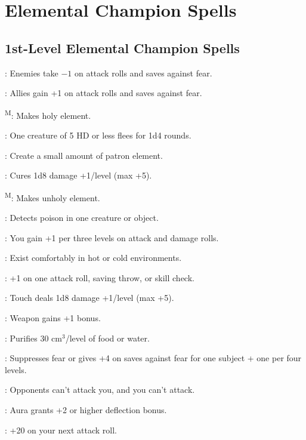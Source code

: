 \section{Elemental Champion Spells}




\subsection{1st-Level Elemental Champion Spells}

: Enemies take $-1$ on attack rolls and saves against fear.

: Allies gain +1 on attack rolls and saves against fear.

\textsuperscript{M}: Makes holy element. %

: One creature of 5 HD or less flees for 1d4 rounds.

: Create a small amount of patron element. %

: Cures 1d8 damage +1/level (max +5).

\textsuperscript{M}: Makes unholy element. %

: Detects poison in one creature or object.

: You gain +1 per three levels on attack and damage rolls.

: Exist comfortably in hot or cold environments.

: +1 on one attack roll, saving throw, or skill check.

: Touch deals 1d8 damage +1/level (max +5).

: Weapon gains +1 bonus.

: Purifies 30 cm$^3$/level of food or water.

: Suppresses fear or gives +4 on saves against fear for one subject + one per four levels.

: Opponents can't attack you, and you can't attack.

: Aura grants +2 or higher deflection bonus.

: +20 on your next attack roll.




